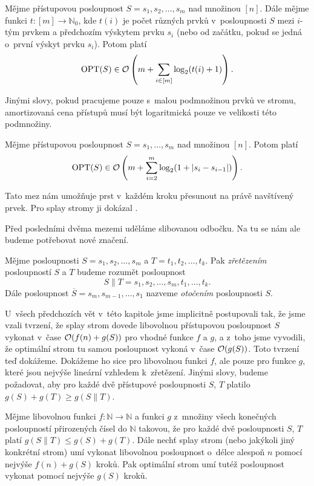 \begin{veta}

Mějme přístupovou posloupnost $S=s_1, s_2,\dots,s_m$ nad množinou $[n]$. Dále mějme funkci $t: [m]\rightarrow \mathbb N_0$, kde $t(i)$ je počet různých prvků v~posloupnosti $S$ mezi $i$-tým prvkem a předchozím výskytem prvku $s_i$ (nebo od začátku, pokud se jedná o~první výskyt prvku $s_i$). Potom platí $$\opt(S) \in \o\left(m + \sum_{i\in [m]}\log (t(i)+1) \right).$$
\end{veta}

Jinými slovy, pokud pracujeme pouze s~malou podmnožinou prvků ve stromu, amortizovaná cena přístupů musí být logaritmická pouze ve velikosti této podmnožiny.

\begin{veta}
Mějme přístupovou posloupnost $S=s_1,\dots,s_m$ nad množinou $[n]$. Potom platí $$\opt(S) \in \o\left(m + \sum_{i=2}^m \log(1 + |s_{i}-s_{i-1}|) \right).$$
\end{veta}

Tato mez nám umožňuje prst v~každém kroku přesunout na právě navštívený prvek. Pro splay stromy ji dokázal \citet{dynamicfinger}.

Před posledními dvěma mezemi uděláme slibovanou odbočku. Na tu se nám ale budeme potřebovat nové značení.

\begin{definice}
Mějme posloupnosti $S=s_1, s_2,\dots, s_m$ a $T=t_1, t_2, \dots, t_k$. Pak
\emph{zřetězením} posloupností $S$ a $T$ budeme rozumět posloupnost $$S\|T = s_1, s_2,\dots, s_m, t_1,\dots,t_k.$$ Dále posloupnost
$\overline{S}=s_m, s_{m-1}, \dots, s_1$  nazveme \emph{otočením} posloupnosti $S$. 
\end{definice}

U~všech předchozích
vět v~této kapitole jsme implicitně postupovali tak, že jsme vzali tvrzení, že splay strom
dovede libovolnou přístupovou posloupnost $S$ vykonat v~čase $\mathcal O(f(n)+g(S))$
pro vhodné funkce $f$ a $g$, a z~toho jsme vyvodili, že optimální strom tu
samou posloupnost vykoná v~čase $\mathcal O(g(S))$. Toto tvrzení teď dokážeme. Dokážeme
ho sice pro libovolnou funkci $f$, ale pouze pro funkce $g$, které jsou nejvýše
lineární vzhledem k~zřetězení. Jinými slovy, budeme požadovat, aby pro každé dvě přístupové posloupnosti $S$, $T$ platilo $g(S) + g(T)\geq
g(S\|T)$.
\begin{tvrz}\label{tvrz:konstantypryc}
Mějme libovolnou funkci $f:\mathbb N \rightarrow \mathbb N$ a funkci $g$ z~množiny všech konečných posloupností přirozených čísel do $\mathbb N$ 
takovou, že pro každé dvě posloupnosti $S$, $T$ platí $g(S\|T)\leq g(S)+g(T)$. Dále nechť splay strom (nebo jakýkoli jiný
konkrétní strom) umí vykonat libovolnou posloupnost o~délce alespoň $n$ pomocí nejvýše
$f(n) + g(S)$ kroků. Pak optimální strom umí tutéž posloupnost vykonat pomocí nejvýše $g(S)$ kroků.
\end{tvrz}

